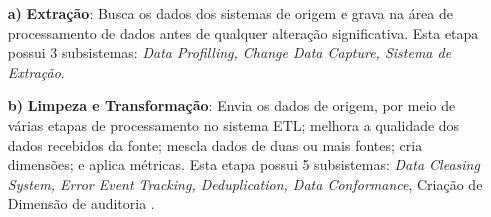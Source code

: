 \begin{itemize}
	\item[\textbf{a)}] \textbf{Extração}: Busca os dados dos sistemas de origem e grava na área de processamento de dados antes de qualquer alteração significativa. Esta etapa possui 3 subsistemas: \textit{Data Profilling, Change Data Capture, Sistema de Extração}.
	
	\item[\textbf{b)}] \textbf{Limpeza e Transformação}: Envia os dados de origem, por meio de várias etapas de processamento no sistema ETL; melhora a qualidade dos dados recebidos da fonte; mescla dados de duas ou mais fontes; cria dimensões; e aplica métricas. Esta etapa possui 5 subsistemas: \textit{Data Cleasing System, Error Event Tracking, Deduplication, Data Conformance}, Criação de Dimensão de auditoria .
	

\end{itemize}
